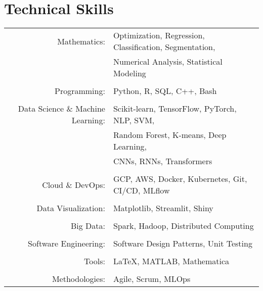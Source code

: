 \documentclass[a4paper,10pt]{article} %
\begin{document}
\vspace{1em}
\section{Technical Skills}

\begin{tabular}{r|l}
Mathematics: & Optimization, Regression, Classification, Segmentation,\\& Numerical Analysis, Statistical Modeling\\
\\
Programming: & Python, R, SQL, C++, Bash\\
\\
Data Science \& Machine Learning: & Scikit-learn, TensorFlow, PyTorch, NLP, SVM,\\& Random Forest, K-means, Deep Learning,\\& CNNs, RNNs, Transformers\\
\\
Cloud \& DevOps: & GCP, AWS, Docker, Kubernetes, Git, CI/CD, MLflow\\
\\
Data Visualization: & Matplotlib, Streamlit, Shiny\\
\\
Big Data: & Spark, Hadoop, Distributed Computing\\
\\
Software Engineering: & Software Design Patterns, Unit Testing\\
\\
Tools: & LaTeX, MATLAB, Mathematica\\
\\
Methodologies: & Agile, Scrum, MLOps\\
\end{tabular}


\end{document}
